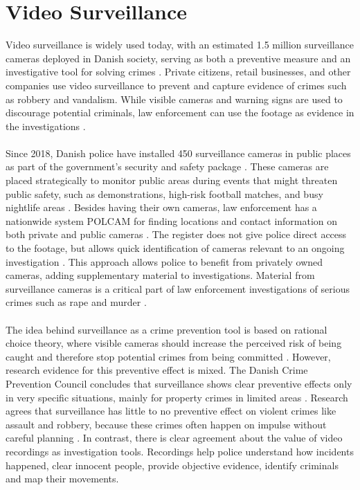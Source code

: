\section{Video Surveillance} \label{sec:videosurveillanceprobana}
Video surveillance is widely used today, with an estimated 1.5 million surveillance cameras deployed in Danish society, serving as both a preventive measure and an investigative tool for solving crimes \cite{overvagningsekspert2025}.
Private citizens, retail businesses, and other companies use video surveillance to prevent and capture evidence of crimes such as robbery and vandalism. While visible cameras and warning signs are used to discourage potential criminals, law enforcement can use the footage as evidence in the investigations \cite{bolius2024}. 
\\\\
Since 2018, Danish police have installed 450 surveillance cameras in public places as part of the government's security and safety package \cite{overvagningsekspert2025,videnskab2024}. These cameras are placed strategically to monitor public areas during events that might threaten public safety, such as demonstrations, high-risk football matches, and busy nightlife areas \cite{dyhrberg2024natteliv}. Besides having their own cameras, law enforcement has a nationwide system \ac{POLCAM} for finding locations and contact information on both private and public cameras \cite{politiet2024registrer,sikkerhedsbranchen2024,securitas2024guide}. The register does not give police direct access to the footage, but allows quick identification of cameras relevant to an ongoing investigation \cite{politiet2024opfordrer}. This approach allows police to benefit from privately owned cameras, adding supplementary material to investigations. Material from surveillance cameras is a critical part of law enforcement investigations of serious crimes such as rape and murder \cite{politiet2024opfordrer}.
\\\\
The idea behind surveillance as a crime prevention tool is based on rational choice theory, where visible cameras should increase the perceived risk of being caught and therefore stop potential crimes from being committed \cite{tryghedspakke2019}. However, research evidence for this preventive effect is mixed. The Danish Crime Prevention Council concludes that surveillance shows clear preventive effects only in very specific situations, mainly for property crimes in limited areas \cite{dkr_tv_overvaagning}. Research agrees that surveillance has little to no preventive effect on violent crimes like assault and robbery, because these crimes often happen on impulse without careful planning \cite{videnskab2024}. In contrast, there is clear agreement about the value of video recordings as investigation tools. Recordings help police understand how incidents happened, clear innocent people, provide objective evidence, identify criminals and map their movements. 


